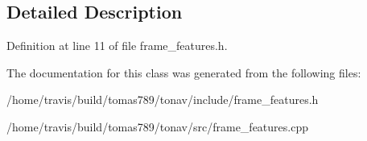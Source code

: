 \subsection{Detailed Description}


Definition at line 11 of file frame\-\_\-features.\-h.



The documentation for this class was generated from the following files\-:\begin{DoxyCompactItemize}
\item 
/home/travis/build/tomas789/tonav/include/frame\-\_\-features.\-h\item 
/home/travis/build/tomas789/tonav/src/frame\-\_\-features.\-cpp\end{DoxyCompactItemize}
